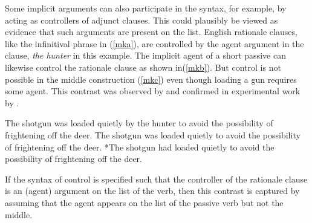 \documentclass[output=paper
                ,modfonts
                ,nonflat
	        ,collection
	        ,collectionchapter
	        ,collectiontoclongg
 	        ,biblatex
                ,babelshorthands
                ,newtxmath
                ,draftmode
                ,colorlinks, citecolor=brown
]{./langsci/langscibook}
\begin{document}
Some implicit arguments can also participate in the syntax, for example, by acting as controllers of adjunct clauses.  This could plausibly be viewed as evidence that such arguments are present on the \argst list.
English rationale clauses, like the infinitival phrase in (\ref{mka}), are controlled  by the agent argument in the clause, \textit{the hunter} in this example.
The implicit agent of a short passive  can likewise control the rationale clause as shown in(\ref{mkb}).
But control is not possible in the middle construction (\ref{mkc}) even though loading a gun requires some agent.
This contrast was observed by \citet{KeyserandRoeper1984} and confirmed in experimental work by \citet{MaunerandKoenig2000}.  

\begin{exe}
\ex\label{mk}
\begin{xlist}
\ex\label{mka}
The shotgun was loaded quietly by the hunter
to avoid the possibility of frightening off the deer.
\ex\label{mkb}The shotgun was loaded quietly
to avoid the possibility of frightening off the deer.
\ex\label{mkc}*The shotgun had loaded quietly
to avoid the possibility of frightening off the deer.
\end{xlist}
\end{exe}



\noindent
If the syntax of control  is specified such that the controller of the rationale clause is an (agent) argument on the \argst list of the verb, then this contrast is captured by assuming that the agent appears on the \argst list of the passive verb but not the middle.
\end{document}
